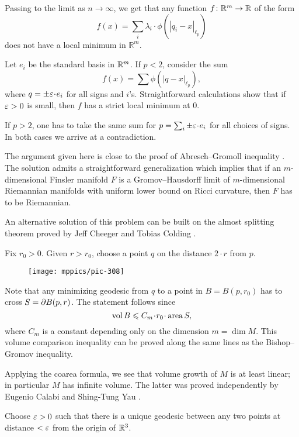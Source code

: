 Passing to the limit as $n\to \infty$, we get that any function $f\:\mathbb{R}^m\z\to\mathbb{R}$
of the form 
$$f(x)=\sum_i\lambda_i\cdot\phi(|q_i-x|_{\ell_p})$$
does not have a local minimum in $\mathbb{R}^m$.

Let $e_i$ be the standard basis in $\mathbb{R}^m$. 
If $p<2$, consider the sum 
$$f(x)=\sum\phi(|q-x|_{\ell_p}),$$
where $q=\pm\eps\cdot e_i$ for all signs and $i$'s.
Straightforward calculations show that if $\varepsilon>0$ is small, then $f$
has a strict local minimum at $0$.

If $p>2$, one has to take the same sum for  $p=\sum_i\pm\eps\cdot e_i$ for all choices of signs.
In both cases we arrive at a contradiction.
\qeds

The argument given here is close to the proof of Abresch--Gromoll inequality \cite{abresch-gromoll}.
The solution admits a straightforward generalization which implies that if an $m$-dimensional  Finsler manifold $F$ is a Gromov--Hausdorff limit of $m$-dimensional Riemannian manifolds with uniform lower bound on Ricci curvature, then $F$ has to be Riemannian.

An alternative solution of this problem can be built on the almost splitting theorem proved by  Jeff Cheeger and Tobias Colding \cite{cheeger-colding}.





Fix $r_0>0$.
Given $r>r_0$, choose a point $q$ on the distance $2\cdot r$ from $p$.

\begin{wrapfigure}{r}{35 mm}
\vskip-5mm
\centering
\texttt{[image: mppics/pic-308]}
\end{wrapfigure}

Note that any minimizing geodesic from $q$ to a point in $B=B(p,r_0)$
has to cross $S\z=\partial B(p,r)$.
The statement follows since  
\[\vol B\le C_m\cdot r_0\cdot \area S,\]
where $C_m$ is a constant depending only on the dimension $m=\dim M$.
This volume comparison inequality can be proved along the same lines as the Bishop--Gromov inequality.
\qeds


Applying the coarea formula, 
we see that volume growth of $M$ is at least linear; 
in particular $M$ has infinite volume.
The latter was proved independently 
by Eugenio Calabi 
and Shing-Tung Yau \cite{calabi,yau-ricci}.



Choose $\varepsilon>0$ such that there is a unique geodesic between any two points at distance $<\varepsilon$ from the origin of $\mathbb{R}^3$.

